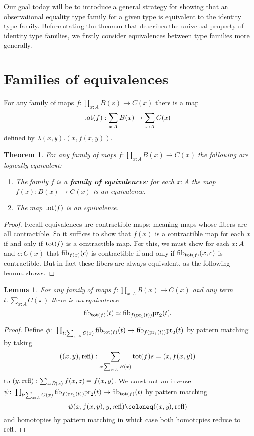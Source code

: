 \documentclass{amsart}
\theoremstyle{theorem}
\newtheorem*{thm}{Theorem}
\newtheorem*{lem}{Lemma}
\theoremstyle{definition}
\theoremstyle{remark}
\newcommand{\0}{\mathbbe{0}}
\newcommand{\1}{\mathbbe{1}}
\newcommand{\2}{\mathbbe{2}}
\newcommand{\3}{\mathbbe{3}}
\newcommand{\4}{\mathbbe{4}}
\newcommand{\term}[1]{{\textup{#1}}}
\newcommand{\type}[1]{{\textup{#1}}}
\newcommand{\pr}{\term{pr}}
\newcommand{\refl}{\term{refl}}
\newcommand{\fib}{\type{fib}}
\begin{document}
Our goal today will be to introduce a general strategy for showing that an observational equality type family for a given type is equivalent to the identity type family. Before stating the theorem that describes the universal property of identity type families, we firstly consider equivalences between type families more generally.


 \section*{Families of equivalences}

For any family of maps $f \colon \prod_{x:A} B(x) \to C(x)$ there is a map
\[ \term{tot}(f) : \sum_{x:A} B(x) \to \sum_{x:A}C(x)\]
defined by $\lambda(x,y).(x,f(x,y))$.

\begin{thm} For any  family of maps $f \colon \prod_{x:A} B(x) \to C(x)$ the following are logically equivalent:
\begin{enumerate}
\item The family $f$ is a \textbf{family of equivalences}: for each $x :A$ the map $f(x) : B(x) \to C(x)$ is an equivalence.
\item The map $\term{tot}(f)$ is an equivalence.
\end{enumerate}
\end{thm}
\begin{proof}
Recall equivalences are contractible maps: meaning maps whose fibers are all contractible. So it suffices to show that $f(x)$ is a contractible map for each $x$ if and only if $\term{tot}(f)$ is a contractible map. For this, we must show for each $x :A$ and $c : C(x)$ that $\fib_{f(x)}(c)$ is contractible if and only if $\fib_{\type{tot}(f)}(x,c)$ is contractible. But in fact these fibers are always equivalent, as the following lemma shows.
\end{proof}

\begin{lem} For any  family of maps $f \colon \prod_{x:A} B(x) \to C(x)$ and any term $t : \sum_{x:A}C(x)$ there is an equivalence
\[
\fib_{\term{tot}(f)}(t) \simeq \fib_{f(\pr_1(t))}\pr_2(t).\]
\end{lem}
\begin{proof}
Define $\phi \colon \prod_{t: \sum_{x:A}C(x)}  \fib_{\term{tot}(f)}(t) \to \fib_{f(\pr_1(t))}\pr_2(t)$ by pattern matching by taking
\[((x,y), \refl) : \sum_{s : \sum_{x:A} B(x)} \type{tot}(f) s = (x, f(x,y))\]
 to $(y,\refl) : \sum_{z : B(x)} f(x,z) = f(x,y)$. We construct an inverse $\psi \colon \prod_{t: \sum_{x:A}C(x)}   \fib_{f(\pr_1(t))}\pr_2(t) \to \fib_{\term{tot}(f)}(t) $ by pattern matching \[ \psi(x,f(x,y),y, \refl) \coloneq ((x,y),\refl)\] and homotopies by pattern matching in which case both homotopies reduce to $\refl$.
\end{proof}
\end{document}
